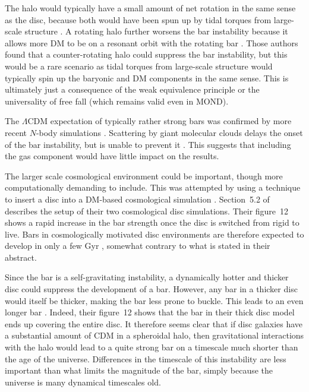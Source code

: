 \documentclass[fleqn,usenatbib,useAMS,onecolumn]{mnras} %
\begin{document}
The halo would typically have a small amount of net rotation in the same sense as the disc, because both would have been spun up by tidal torques from large-scale structure \citep{Doroshkevich_1970, White_1984}. A rotating halo further worsens the bar instability because it allows more DM to be on a resonant orbit with the rotating bar \citep{Saha_2013}. Those authors found that a counter-rotating halo could suppress the bar instability, but this would be a rare scenario as tidal torques from large-scale structure would typically spin up the baryonic and DM components in the same sense. This is ultimately just a consequence of the weak equivalence principle or the universality of free fall (which remains valid even in MOND).

The $\Lambda$CDM expectation of typically rather strong bars was confirmed by more recent $N$-body simulations \citep{Sellwood_2016, Berrier_2016}. Scattering by giant molecular clouds delays the onset of the bar instability, but is unable to prevent it \citep{Aumer_2016}. This suggests that including the gas component would have little impact on the results.

The larger scale cosmological environment could be important, though more computationally demanding to include. This was attempted by \citet{Bauer_2019} using a technique to insert a disc into a DM-based cosmological simulation \citep{Bauer_2018}. Section~5.2 of \citet{Bauer_2019} describes the setup of their two cosmological disc simulations. Their figure~12 shows a rapid increase in the bar strength once the disc is switched from rigid to live. Bars in cosmologically motivated disc environments are therefore expected to develop in only a few Gyr \citep{Bauer_2019}, somewhat contrary to what is stated in their abstract.

Since the bar is a self-gravitating instability, a dynamically hotter and thicker disc could suppress the development of a bar. However, any bar in a thicker disc would itself be thicker, making the bar less prone to buckle. This leads to an even longer bar \citep{Klypin_2009}. Indeed, their figure~12 shows that the bar in their thick disc model ends up covering the entire disc. It therefore seems clear that if disc galaxies have a substantial amount of CDM in a spheroidal halo, then gravitational interactions with the halo would lead to a quite strong bar on a timescale much shorter than the age of the universe. Differences in the timescale of this instability are less important than what limits the magnitude of the bar, simply because the universe is many dynamical timescales old.
\end{document}
